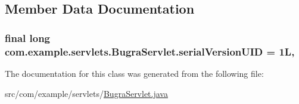 \subsection{Member Data Documentation}
\subsubsection[{\texorpdfstring{serial\+Version\+U\+ID}{serialVersionUID}}]{\setlength{\rightskip}{0pt plus 5cm}final long com.\+example.\+servlets.\+Bugra\+Servlet.\+serial\+Version\+U\+ID = 1L\hspace{0.3cm}{\ttfamily [static]}, {\ttfamily [private]}}\hypertarget{classcom_1_1example_1_1servlets_1_1_bugra_servlet_a017b832dab85959c1a172b508ce28716}{}\label{classcom_1_1example_1_1servlets_1_1_bugra_servlet_a017b832dab85959c1a172b508ce28716}


The documentation for this class was generated from the following file\+:\begin{DoxyCompactItemize}
\item 
src/com/example/servlets/\hyperlink{_bugra_servlet_8java}{Bugra\+Servlet.\+java}\end{DoxyCompactItemize}
